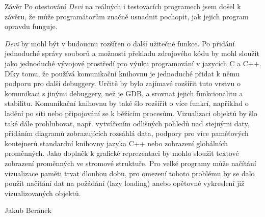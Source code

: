 \documentclass[czech,bachelor,male,python,dept460]{diploma}						%
\begin{document}
\begin{section}{Závěr}
\label{sec:Conclusion}
	Po otestování \textit{Devi} na reálných i testovacích programech jsem došel k závěru, že může programátorům značně usnadnit pochopit, jak jejich program
	opravdu funguje.

	\textit{Devi} by mohl být v budoucnu rozšířen o další užitečné funkce. Po přidání jednoduché správy souborů a možnosti překladu
	zdrojového kódu by mohl sloužit jako jednoduché vývojové prostředí pro výuku programování v jazycích C a C++.
	Díky tomu, že používá komunikační knihovnu je jednoduché přidat k němu podporu pro další debuggery. Určitě by bylo
	zajímavé rozšířit tuto vrstvu o komunikaci s jinými debuggery, než je GDB, a srovnat jejich funkcionalitu a stabilitu.
	Komunikační knihovnu by také šlo rozšířit o více funkcí, například o ladění po síti nebo připojování se k běžícím procesům.
	Vizualizaci objektů by šlo také dále prohlubovat, např. vytvářením odlišných pohledů nad stejnými daty, přidáním diagramů zobrazujících rozsáhlá data,
	podpory pro více paměťových kontejnerů standardní knihovny jazyka C++ nebo zobrazení globálních proměnných.
	Jako doplněk k grafické reprezentaci by mohlo sloužit textové zobrazení proměnných ve stromové struktuře.
	Pro velké programy může načítání vizualizace paměti trvat dlouhou dobu, pro omezení tohoto problému by se dalo použít načítání dat na požádání
	(lazy loading) anebo opětovné vykreslení již vizualizovaných objektů.
\end{section}

\bigskip
\begin{flushright}
Jakub Beránek
\end{flushright}

\printbibliography %
\end{document}
